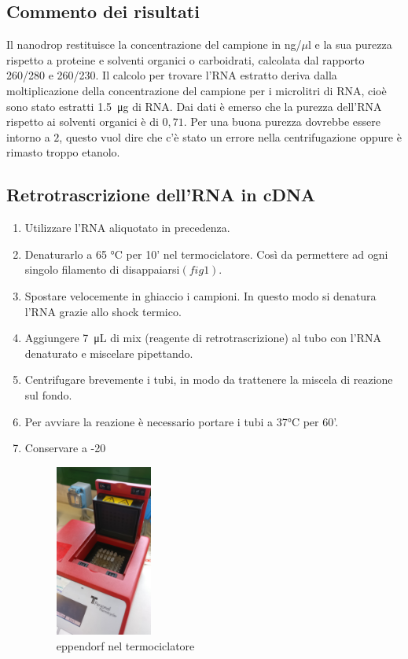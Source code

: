 \subsection{Commento dei risultati}
Il nanodrop restituisce la concentrazione del campione in ng/$\mu$l e la sua purezza rispetto
a proteine e solventi organici o carboidrati, calcolata dal rapporto 260/280 e 260/230.
Il calcolo per trovare l'RNA estratto deriva dalla moltiplicazione della concentrazione del
campione per i microlitri di RNA, cioè sono stato estratti \SI{1,5}{\micro\gram} di RNA.
Dai dati è emerso che la purezza dell'RNA rispetto ai solventi organici è di $0,71$.
Per una buona purezza dovrebbe essere intorno a $2$, questo vuol dire
che c'è stato un errore nella centrifugazione oppure è rimasto troppo etanolo.

\subsection{Retrotrascrizione dell'RNA in cDNA}
\begin{enumerate}

\item Utilizzare l'RNA aliquotato in precedenza.
\item Denaturarlo a 65 °C per 10' nel termociclatore.
Così da permettere ad ogni singolo filamento di disappaiarsi$(fig1)$.
\item Spostare velocemente in ghiaccio i campioni.
In questo modo si denatura l'RNA grazie allo shock termico.
\item Aggiungere \SI{7}{\micro\liter} di mix (reagente di retrotrascrizione) al tubo con l'RNA
denaturato e miscelare pipettando.
\item Centrifugare brevemente i tubi,
in modo da trattenere la miscela di reazione sul fondo.
\item Per avviare la reazione \`e necessario portare i tubi a 37°C per 60'.
\item Conservare a -20\textcelsius

\begin{figure}[H]

\centering
\includegraphics[width=0.3\textwidth]{./immagini/termociclatore.jpg}
\caption{eppendorf nel termociclatore}
\label{termociclatore}

\end{figure}

\end{enumerate}
